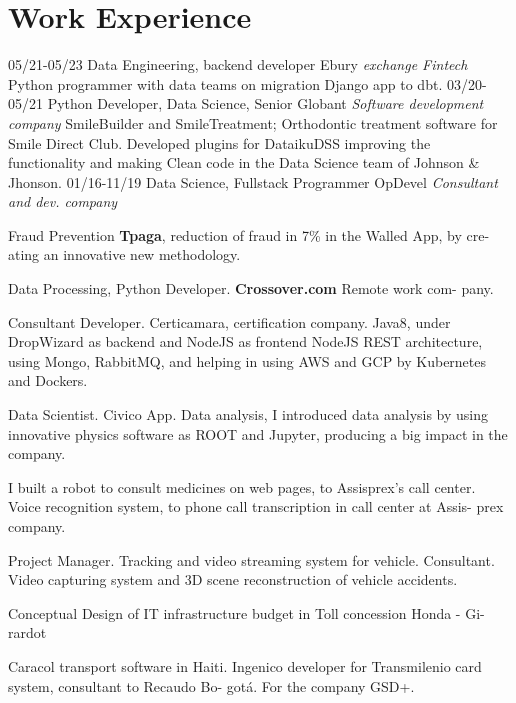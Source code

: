 \section{Work Experience}

\begin{entrylist}
  \entry
    {05/21-05/23}       
    {Data Engineering, backend developer}
    {Ebury {\sl exchange Fintech}}
    {Python programmer with data teams on migration Django app to dbt.}
  \entry
    {03/20-05/21}
    {Python Developer, Data Science, Senior}
    {Globant {\sl Software development company}}
    {SmileBuilder and SmileTreatment; Orthodontic treatment software for Smile Direct Club.
Developed plugins for DataikuDSS improving the functionality and making
    Clean code in the Data Science team of Johnson \& Jhonson.}
  \entry
    {01/16-11/19}
    {Data Science, Fullstack Programmer}
    {OpDevel {\sl Consultant and dev. company}}
    {Fraud Prevention \textbf{Tpaga}, reduction of fraud in 7\% in the Walled App, by cre-
ating an innovative new methodology.

	Data Processing, Python Developer. \textbf{Crossover.com} Remote work com-
pany.

Consultant Developer. Certicamara, certification company. Java8, under
DropWizard as backend and NodeJS as frontend NodeJS REST architecture,
using Mongo, RabbitMQ, and helping in using AWS and GCP by Kubernetes
and Dockers.

Data Scientist. Civico App. Data analysis, I introduced data analysis by using
innovative physics software as ROOT and Jupyter, producing a big impact in
the company.

I built a robot to consult medicines on web pages, to Assisprex’s call center.
Voice recognition system, to phone call transcription in call center at Assis-
prex company.

Project Manager. Tracking and video streaming system for vehicle.
Consultant. Video capturing system and 3D scene reconstruction of vehicle
accidents.

Conceptual Design of IT infrastructure budget in Toll concession Honda - Gi-
rardot

Caracol transport software in Haiti.
Ingenico developer for Transmilenio card system, consultant to Recaudo Bo-
        gotá. For the company GSD+.}
\end{entrylist}

\newpage


